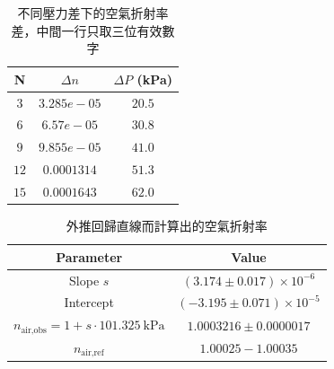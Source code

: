 \begin{table}[htb!]
\centering
\caption{不同壓力差下的空氣折射率差，中間一行只取三位有效數字}
\begin{tabular}{ccc}
\toprule
N & $\Delta n$ & $\Delta P$ (\unit{\kPa}) \\
\midrule
$3$ & $3.285e-05$ & $20.5$ \\
$6$ & $6.57e-05$ & $30.8$ \\
$9$ & $9.855e-05$ & $41.0$ \\
$12$ & $0.0001314$ & $51.3$ \\
$15$ & $0.0001643$ & $62.0$ \\
\bottomrule
\end{tabular}
\end{table}
\begin{table}[htb!]
\centering
\caption{外推回歸直線而計算出的空氣折射率}
\begin{tabular}{cc}
\toprule
Parameter & Value \\
\midrule
Slope $s$ & $(3.174 \pm 0.017)\times 10^{-6}$ \\
Intercept & $(-3.195 \pm 0.071)\times 10^{-5}$ \\
$n_{\text{air,obs}}=1+s\cdot\qty{101.325}{\kPa}$ & $1.0003216 \pm 0.0000017$ \\
$n_{\text{air,ref}}$ & $1.00025{-}1.00035$ \\
\bottomrule
\end{tabular}
\end{table}
